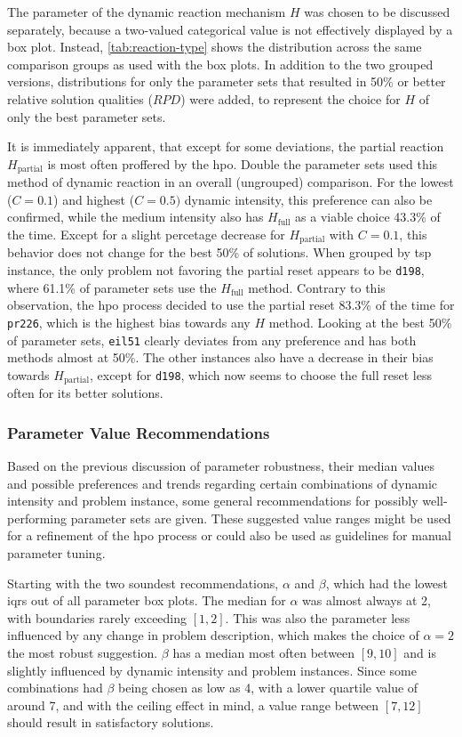 The parameter of the dynamic reaction mechanism $H$ was chosen to be discussed separately, because a two-valued categorical value is not effectively displayed by a box plot. Instead, \cref{tab:reaction-type} shows the distribution across the same comparison groups as used with the box plots. In addition to the two grouped versions, distributions for only the parameter sets that resulted in 50\% or better relative solution qualities ($RPD$) were added, to represent the choice for $H$ of only the best parameter sets.

It is immediately apparent, that except for some deviations, the partial reaction $H_\text{partial}$ is most often proffered by the \glsdesc{hpo}. Double the parameter sets used this method of dynamic reaction in an overall (ungrouped) comparison. For the lowest ($C=0.1$) and highest ($C=0.5)$ dynamic intensity, this preference can also be confirmed, while the medium intensity also has $H_\text{full}$ as a viable choice 43.3\% of the time. Except for a slight percetage decrease for $H_\text{partial}$ with $C=0.1$, this behavior does not change for the best 50\% of solutions.
When grouped by \gls{tsp} instance, the only problem not favoring the partial reset appears to be \texttt{d198}, where 61.1\% of parameter sets use the $H_\text{full}$ method. Contrary to this observation, the \gls{hpo} process decided to use the partial reset 83.3\% of the time for \texttt{pr226}, which is the highest bias towards any $H$ method. Looking at the best 50\% of parameter sets, \texttt{eil51} clearly deviates from any preference and has both methods almost at 50\%. The other instances also have a decrease in their bias towards $H_\text{partial}$, except for \texttt{d198}, which now seems to choose the full reset less often for its better solutions.

\subsubsection{Parameter Value Recommendations}

Based on the previous discussion of parameter robustness, their median values and possible preferences and trends regarding certain combinations of dynamic intensity and problem instance, some general recommendations for possibly well-performing parameter sets are given. These suggested value ranges might be used for a refinement of the \gls{hpo} process or could also be used as guidelines for manual parameter tuning.

Starting with the two soundest recommendations, $\alpha$ and $\beta$, which had the lowest \glspl{iqr} out of all parameter box plots. The median for $\alpha$ was almost always at 2, with boundaries rarely exceeding $[1,2]$. This was also the parameter less influenced by any change in problem description, which makes the choice of $\alpha = 2$ the most robust suggestion. $\beta$ has a median most often between $[9,10]$ and is slightly influenced by dynamic intensity and problem instances. Since some combinations had $\beta$ being chosen as low as 4, with a lower quartile value of around 7, and with the ceiling effect in mind, a value range between $[7,12]$ should result in satisfactory solutions.




